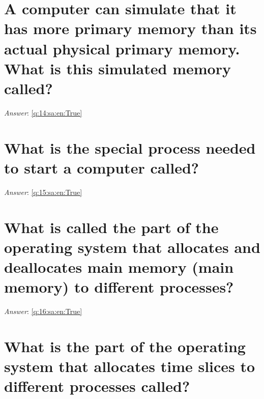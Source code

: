 \documentclass[a4paper,11pt,oneside]{book}
\begin{document}
\begin{sloppypar}
\section{A computer can simulate that it has more primary memory than its actual physical primary memory. What is this simulated memory called?}

\label{q:14:sa:en:False}

\vspace{2cm}

\noindent\makebox[\textwidth]{\hrulefill}

\vspace{1cm}

\textit{Answer}: \autoref{q:14:sa:en:True}



\section{What is the special process needed to start a computer called?}

\label{q:15:sa:en:False}

\vspace{2cm}

\noindent\makebox[\textwidth]{\hrulefill}

\vspace{1cm}

\textit{Answer}: \autoref{q:15:sa:en:True}



\section{What is called the part of the operating system that allocates and deallocates main memory (main memory) to different processes?}

\label{q:16:sa:en:False}

\vspace{2cm}

\noindent\makebox[\textwidth]{\hrulefill}

\vspace{1cm}

\textit{Answer}: \autoref{q:16:sa:en:True}



\section{What is the part of the operating system that allocates time slices to different processes called?}


\end{sloppypar}
\end{document}
